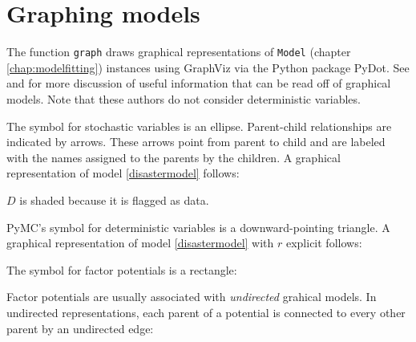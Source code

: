 \hypertarget{graphical}{}
\section*{Graphing models} \label{graphical}

The function \texttt{graph} draws graphical representations of \texttt{Model} (chapter \ref{chap:modelfitting}) instances using GraphViz via the Python package PyDot. See \cite{dawidmarkov} and \cite{jordangraphical} for more discussion of useful information that can be read off of graphical models. Note that these authors do not consider deterministic variables.

The symbol for stochastic variables is an ellipse. Parent-child relationships are indicated by arrows. These arrows point from parent to child and are labeled with the names assigned to the parents by the children. A graphical representation of model \ref{disastermodel} follows:
\begin{center}
\end{center} 
$D$ is shaded because it is flagged as data.

PyMC's symbol for deterministic variables is a downward-pointing triangle. A graphical representation of model \ref{disastermodel} with $r$ explicit follows:
\begin{center}
\end{center}

The symbol for factor potentials is a rectangle:
\begin{center}
\end{center}
Factor potentials are usually associated with \emph{undirected} grahical models. In undirected representations, each parent of a potential is connected to every other parent by an undirected edge:
\begin{center}
\end{center}

